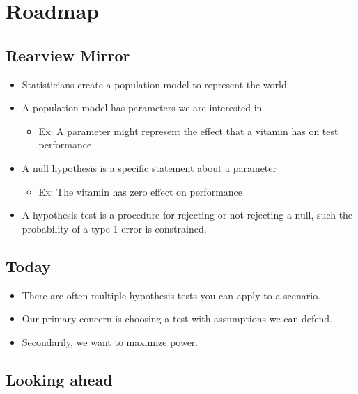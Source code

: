 \documentclass[
]{book}
\providecommand{\tightlist}{%
  \setlength{\itemsep}{0pt}\setlength{\parskip}{0pt}}
\theoremstyle{definition}
\theoremstyle{definition}
\theoremstyle{definition}
\theoremstyle{definition}
\theoremstyle{remark}
\begin{document}
\hypertarget{roadmap-3}{%
\section{Roadmap}\label{roadmap-3}}

\hypertarget{rearview-mirror-1}{%
\subsection{Rearview Mirror}\label{rearview-mirror-1}}

\begin{itemize}
\tightlist
\item
  Statisticians create a population model to represent the world
\item
  A population model has parameters we are interested in

  \begin{itemize}
  \tightlist
  \item
    Ex: A parameter might represent the effect that a vitamin has on test performance
  \end{itemize}
\item
  A null hypothesis is a specific statement about a parameter

  \begin{itemize}
  \tightlist
  \item
    Ex: The vitamin has zero effect on performance
  \end{itemize}
\item
  A hypothesis test is a procedure for rejecting or not rejecting a null, such the probability of a type 1 error is constrained.
\end{itemize}

\hypertarget{today}{%
\subsection{Today}\label{today}}

\begin{itemize}
\tightlist
\item
  There are often multiple hypothesis tests you can apply to a scenario.
\item
  Our primary concern is choosing a test with assumptions we can defend.
\item
  Secondarily, we want to maximize power.
\end{itemize}

\hypertarget{looking-ahead}{%
\subsection{Looking ahead}\label{looking-ahead}}
\end{document}

